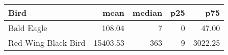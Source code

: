 
\begin{tabular}{l|r|r|r|r}
\hline
Bird & mean & median & p25 & p75\\
\hline
Bald Eagle & 108.04 & 7 & 0 & 47.00\\
\hline
Red Wing Black Bird & 15403.53 & 363 & 9 & 3022.25\\
\hline
\end{tabular}